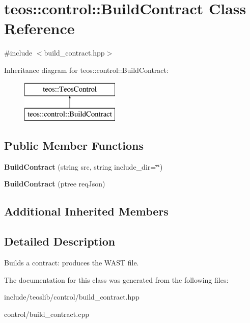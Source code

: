 \hypertarget{classteos_1_1control_1_1_build_contract}{}\section{teos\+:\+:control\+:\+:Build\+Contract Class Reference}
\label{classteos_1_1control_1_1_build_contract}


{\ttfamily \#include $<$build\+\_\+contract.\+hpp$>$}

Inheritance diagram for teos\+:\+:control\+:\+:Build\+Contract\+:\begin{figure}[H]
\begin{center}
\leavevmode
\includegraphics[height=2.000000cm]{classteos_1_1control_1_1_build_contract}
\end{center}
\end{figure}
\subsection*{Public Member Functions}
\begin{DoxyCompactItemize}
\item 
\mbox{\label{classteos_1_1control_1_1_build_contract_a4e421b3614f96648b714a00610839f56}} 
{\bfseries Build\+Contract} (string src, string include\+\_\+dir=\char`\"{}\char`\"{})
\item 
\mbox{\label{classteos_1_1control_1_1_build_contract_ac1bce2ea02bad0e31d3f7b9c06fef36e}} 
{\bfseries Build\+Contract} (ptree req\+Json)
\end{DoxyCompactItemize}
\subsection*{Additional Inherited Members}


\subsection{Detailed Description}
Builds a contract\+: produces the W\+A\+ST file. 

The documentation for this class was generated from the following files\+:\begin{DoxyCompactItemize}
\item 
include/teoslib/control/build\+\_\+contract.\+hpp\item 
control/build\+\_\+contract.\+cpp\end{DoxyCompactItemize}
